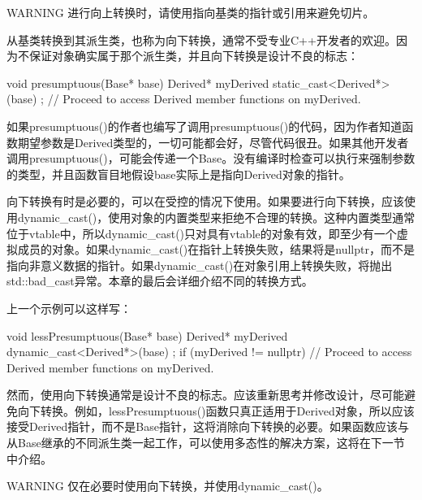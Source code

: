 \begin{myWarning}{WARNING}
进行向上转换时，请使用指向基类的指针或引用来避免切片。
\end{myWarning}

从基类转换到其派生类，也称为向下转换，通常不受专业C++开发者的欢迎。因为不保证对象确实属于那个派生类，并且向下转换是设计不良的标志：

\begin{cpp}
void presumptuous(Base* base)
{
    Derived* myDerived { static_cast<Derived*>(base) };
    // Proceed to access Derived member functions on myDerived.
}
\end{cpp}

如果presumptuous()的作者也编写了调用presumptuous()的代码，因为作者知道函数期望参数是Derived类型的，一切可能都会好，尽管代码很丑。如果其他开发者调用presumptuous()，可能会传递一个Base。没有编译时检查可以执行来强制参数的类型，并且函数盲目地假设base实际上是指向Derived对象的指针。

向下转换有时是必要的，可以在受控的情况下使用。如果要进行向下转换，应该使用dynamic\_cast()，使用对象的内置类型来拒绝不合理的转换。这种内置类型通常位于vtable中，所以dynamic\_cast()只对具有vtable的对象有效，即至少有一个虚拟成员的对象。如果dynamic\_cast()在指针上转换失败，结果将是nullptr，而不是指向非意义数据的指针。如果dynamic\_cast()在对象引用上转换失败，将抛出std::bad\_cast异常。本章的最后会详细介绍不同的转换方式。

上一个示例可以这样写：

\begin{cpp}
void lessPresumptuous(Base* base)
{
    Derived* myDerived { dynamic_cast<Derived*>(base) };
    if (myDerived != nullptr) {
        // Proceed to access Derived member functions on myDerived.
    }
}
\end{cpp}

然而，使用向下转换通常是设计不良的标志。应该重新思考并修改设计，尽可能避免向下转换。例如，lessPresumptuous()函数只真正适用于Derived对象，所以应该接受Derived指针，而不是Base指针，这将消除向下转换的必要。如果函数应该与从Base继承的不同派生类一起工作，可以使用多态性的解决方案，这将在下一节中介绍。

\begin{myWarning}{WARNING}
仅在必要时使用向下转换，并使用dynamic\_cast()。
\end{myWarning}







